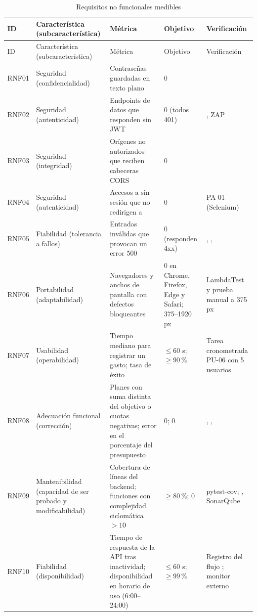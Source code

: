 {\footnotesize\renewcommand{\arraystretch}{1.15}
\begin{longtable}{L{1.35cm} L{2.6cm} L{3.7cm} L{2.3cm} L{3.55cm}}
\caption{Requisitos no funcionales medibles}\label{tab:rnf}\\
\toprule
ID & Característica (subcaracterística) & Métrica & Objetivo & Verificación \\
\midrule
\endfirsthead
\toprule
ID & Característica (subcaracterística) & Métrica & Objetivo & Verificación \\
\midrule
\endhead
\bottomrule
\endfoot
RNF01 & Seguridad (confidencialidad) & Contraseñas guardadas en texto plano & 0 &  \\
RNF02 & Seguridad (autenticidad) & Endpoints de datos que responden sin JWT & 0 (todos 401) & , ZAP \\
RNF03 & Seguridad (integridad) & Orígenes no autorizados que reciben cabeceras CORS & 0 &  \\
RNF04 & Seguridad (autenticidad) & Accesos a  sin sesión que no redirigen a  & 0 & PA-01 (Selenium) \\
RNF05 & Fiabilidad (tolerancia a fallos) & Entradas inválidas que provocan un error 500 & 0 (responden 4xx) & , ,  \\
RNF06 & Portabilidad (adaptabilidad) & Navegadores y anchos de pantalla con defectos bloqueantes & 0 en Chrome, Firefox, Edge y Safari; 375–1920 px & LambdaTest y prueba manual a 375 px \\
RNF07 & Usabilidad (operabilidad) & Tiempo mediano para registrar un gasto; tasa de éxito & $\leq 60$ s; $\geq 90$\,\% & Tarea cronometrada PU-06 con 5 usuarios \\
RNF08 & Adecuación funcional (corrección) & Planes con suma distinta del objetivo o cuotas negativas; error en el porcentaje del presupuesto & 0; 0 & , ,  \\
RNF09 & Mantenibilidad (capacidad de ser probado y modificabilidad) & Cobertura de líneas del backend; funciones con complejidad ciclomática $> 10$ & $\geq 80$\,\%; 0 & pytest-cov; , SonarQube \\
RNF10 & Fiabilidad (disponibilidad) & Tiempo de respuesta de la API tras inactividad; disponibilidad en horario de uso (6:00–24:00) & $\leq 60$ s; $\geq 99$\,\% & Registro del flujo ; monitor externo \\

\end{longtable}}
